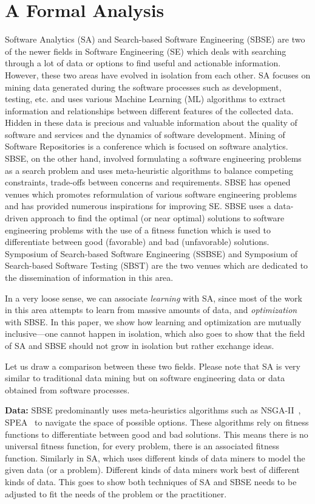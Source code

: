 \documentclass[table, xcdraw, sigconf,review, anonymous]{acmart}
\begin{document}
\section{A Formal Analysis}


Software Analytics (SA) and Search-based Software Engineering (SBSE) are two of the newer fields in Software Engineering (SE) which deals with searching through a lot of data or options to find useful and actionable information. However, these two areas have evolved in isolation from each other. 
SA focuses on mining data generated during the software processes such as development, testing, etc. and uses various Machine Learning (ML) algorithms to extract information and relationships between different features of the collected data. 
Hidden in these data is precious and valuable information about the quality of software and services and the dynamics of software development. Mining of Software Repositories is a conference which is focused on software analytics. SBSE, on the other hand, involved formulating a software engineering problems as a search problem and uses meta-heuristic algorithms to balance competing constraints, trade-offs between concerns and requirements. SBSE has opened venues which promotes reformulation of various software engineering problems and has provided numerous inspirations for improving SE.  SBSE uses a data-driven approach to find the optimal (or near optimal) solutions to software engineering problems with the use of a fitness function which is used to differentiate between good (favorable) and bad (unfavorable) solutions. Symposium of Search-based Software Engineering (SSBSE) and Symposium of Search-based Software Testing (SBST) are the two venues which are dedicated to the dissemination of information in this area.

In a very loose sense, we can associate \textit{learning} with SA, since most of the work in this area attempts to learn from massive amounts of data, and \textit{optimization} with SBSE. In this paper, we show how learning and optimization are mutually inclusive---one cannot happen in isolation, which also goes to show that the field of SA and SBSE should not grow in isolation but rather exchange ideas.  

Let us draw a comparison between these two fields. Please note that SA is very similar to traditional data mining but on software engineering data or data obtained from software processes. 

\noindent\textbf{Data:} SBSE predominantly uses meta-heuristics algorithms such as NSGA-II~\cite{deb2000fast}, SPEA~\cite{zitzler2001spea2} to navigate the space of possible options. These algorithms rely on fitness functions to differentiate between good and bad solutions. This means there is no universal fitness function, for every problem, there is an associated fitness function. Similarly in SA, which uses different kinds of data miners to model the given data (or a problem). Different kinds of data miners work best of different kinds of data. This goes to show both techniques of SA and SBSE needs to be adjusted to fit the needs of the problem or the practitioner. 
\end{document}
